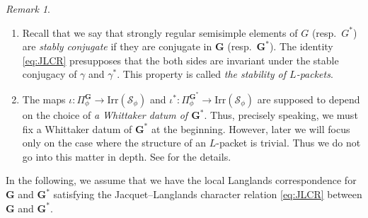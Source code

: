 \documentclass{amsart}
\newcommand{\bfG}{\mathbf{G}}
\theoremstyle{plain}
\theoremstyle{definition}
\theoremstyle{remark}
\newtheorem{rem}[thm]{Remark}
\theoremstyle{theorem}
\begin{document}
\begin{rem}
\begin{enumerate}
\item
Recall that we say that strongly regular semisimple elements of $G$ (resp.\ $G^{\ast}$) are \textit{stably conjugate} if they are conjugate in $\bfG$ (resp.\ $\bfG^{\ast}$).
The identity \eqref{eq:JLCR} presupposes that the both sides are invariant under the stable conjugacy of $\gamma$ and $\gamma^{\ast}$.
This property is called \textit{the stability of $L$-packets}.
\item
The maps $\iota\colon\Pi^{\bfG}_{\phi}\rightarrow\mathrm{Irr}(\mathcal{S}_{\phi})$ and $\iota^{\ast}\colon\Pi^{\bfG^{\ast}}_{\phi}\rightarrow\mathrm{Irr}(\mathcal{S}_{\phi})$ are supposed to depend on the choice of \textit{a Whittaker datum of $\bfG^{\ast}$}.
Thus, precisely speaking, we must fix a Whittaker datum of $\bfG^{\ast}$ at the beginning.
However, later we will focus only on the case where the structure of an $L$-packet is trivial.
Thus we do not go into this matter in depth.
See \cite{Kal16-LLC} for the details.
\end{enumerate}
\end{rem}

In the following, we assume that we have the local Langlands correspondence for $\bfG$ and $\bfG^{\ast}$ satisfying the Jacquet--Langlands character relation \eqref{eq:JLCR} between $\bfG$ and $\bfG^{\ast}$.
\end{document}
